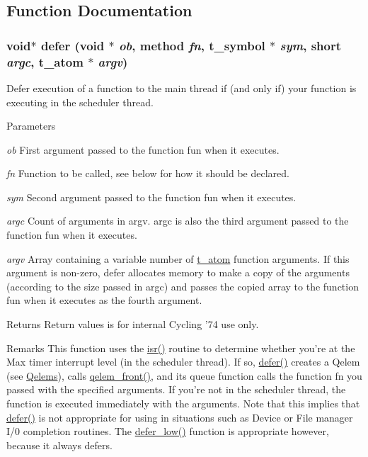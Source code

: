 \subsection{Function Documentation}
\hypertarget{group__threading_gaa24a0c9896f1ad241e45590065c3f643}{
\subsubsection[{defer}]{\setlength{\rightskip}{0pt plus 5cm}void$\ast$ defer (void $\ast$ {\em ob}, \/  {\bf method} {\em fn}, \/  {\bf t\_\-symbol} $\ast$ {\em sym}, \/  short {\em argc}, \/  {\bf t\_\-atom} $\ast$ {\em argv})}}
\label{group__threading_gaa24a0c9896f1ad241e45590065c3f643}


Defer execution of a function to the main thread if (and only if) your function is executing in the scheduler thread. 
\begin{DoxyParams}{Parameters}
\item[{\em ob}]First argument passed to the function fun when it executes. \item[{\em fn}]Function to be called, see below for how it should be declared. \item[{\em sym}]Second argument passed to the function fun when it executes. \item[{\em argc}]Count of arguments in argv. argc is also the third argument passed to the function fun when it executes. \item[{\em argv}]Array containing a variable number of \hyperlink{structt__atom}{t\_\-atom} function arguments. If this argument is non-\/zero, defer allocates memory to make a copy of the arguments (according to the size passed in argc) and passes the copied array to the function fun when it executes as the fourth argument. \end{DoxyParams}
\begin{DoxyReturn}{Returns}
Return values is for internal Cycling '74 use only.
\end{DoxyReturn}
\begin{DoxyRemark}{Remarks}
This function uses the \hyperlink{group__threading_gad60dbceb5e50471a3ec76f608a9ea35c}{isr()} routine to determine whether you’re at the Max timer interrupt level (in the scheduler thread). If so, \hyperlink{group__threading_gaa24a0c9896f1ad241e45590065c3f643}{defer()} creates a Qelem (see \hyperlink{group__qelems}{Qelems}), calls \hyperlink{group__qelems_gab5fa3e43e7851d1a2049ee28f5275955}{qelem\_\-front()}, and its queue function calls the function fn you passed with the specified arguments. If you’re not in the scheduler thread, the function is executed immediately with the arguments. Note that this implies that \hyperlink{group__threading_gaa24a0c9896f1ad241e45590065c3f643}{defer()} is not appropriate for using in situations such as Device or File manager I/0 completion routines. The \hyperlink{group__threading_ga486daa40ddb16f70b663615695d18315}{defer\_\-low()} function is appropriate however, because it always defers.
\end{DoxyRemark}
